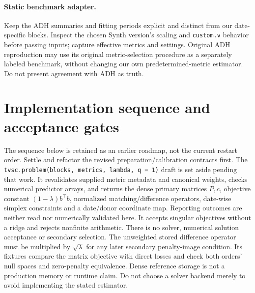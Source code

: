 \documentclass[11pt]{article}
\begin{document}
\paragraph{Static benchmark adapter.}
Keep the ADH summaries and fitting periods explicit and distinct from
our date-specific blocks. Inspect the chosen Synth version's scaling and
\texttt{custom.v} behavior before passing inputs; capture effective metrics
and settings. Original ADH reproduction may use its original metric-selection
procedure as a separately labeled benchmark, without changing our own
predetermined-metric estimator. Do not present agreement with ADH as truth.

\section{Implementation sequence and acceptance gates}
The sequence below is retained as an earlier roadmap, not the current
restart order. Settle and refactor the revised preparation/calibration
contracts first. The \texttt{tvsc.problem(blocks, metrics, lambda, q = 1)}
draft is set aside pending that work. It revalidates supplied metric
metadata and canonical weights, checks numerical predictor arrays, and
returns the dense primary matrices $P,c$, objective constant
$(1-\lambda)b^\top b$, normalized matching/difference operators, date-wise
simplex constraints and a date/donor coordinate map. Reporting outcomes
are neither read nor numerically validated here. It accepts singular
objectives without a ridge and rejects nonfinite arithmetic. There is no
solver, numerical solution acceptance or secondary selection. The
unweighted stored difference operator must be multiplied by
$\sqrt\lambda$ for any later secondary penalty-image condition.
Its fixtures compare the matrix objective with direct losses and check
both orders' null spaces and zero-penalty equivalence. Dense reference
storage is not a production memory or runtime claim. Do not choose a
solver backend merely to avoid implementing the stated estimator.
\end{document}
